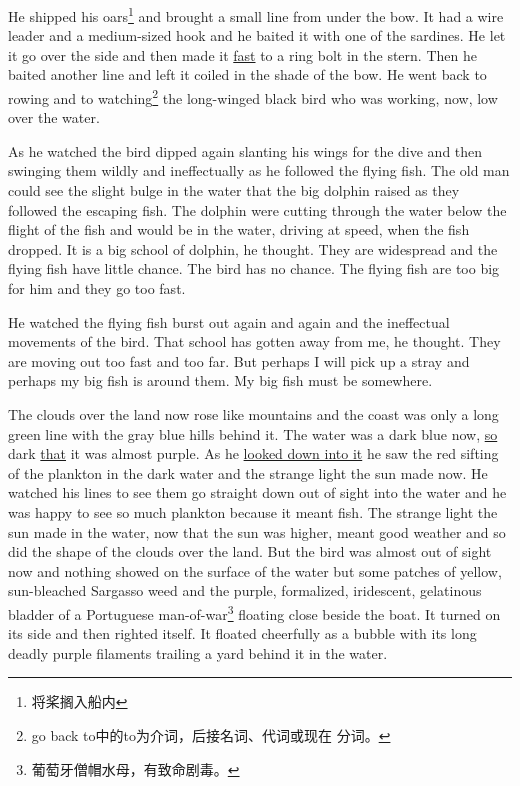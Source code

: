 \documentclass[fontset=ubuntu]{ctexrep}
\newlength{\drop}%
\begin{document}
He shipped his oars\footnote{将桨搁入船内} and brought a small line from
under the bow. It had a \gls{wire} \gls{leader} and a medium-sized hook and
he baited it with one of the sardines. He let it go over the side and then
made it \uline{fast} to a ring \gls{bolt} in the stern. Then he baited
another line and left it coiled in the shade of the bow. He went back to
rowing and to watching\footnote{go back to中的to为介词，后接名词、代词或现在
  分词。} the long-winged black bird who was working, now, low over the
water.

As he watched the bird dipped again slanting his wings for the dive and then
swinging them wildly and \gls{ineffectually} as he followed the flying fish.
The old man could see the \gls{slight} \gls{bulge} in the water that the big
dolphin raised as they followed the escaping fish. The dolphin were cutting
through the water below the flight of the fish and would be in the water,
driving at speed, when the fish dropped. It is a big school of dolphin, he
thought. They are \gls{widespread} and the flying fish have little
\gls{chance}. The bird has no chance. The flying fish are too big for him
and they go too fast.

He watched the flying fish \gls{burst} out again and again and the
\gls{ineffectual} movements of the bird. That school has gotten away from
me, he thought. They are moving out too fast and too far. But perhaps I will
pick up a \gls{stray} and perhaps my big fish is around them. My big fish must be
somewhere.

The clouds over the land now rose like mountains and the coast was only a
long green line with the gray blue hills behind it. The water was a dark
blue now, \uline{so} dark \uline{that} it was almost purple. As he \uline{looked down into it}
he saw the red sifting of the \gls{plankton} in the dark water and the
strange light the sun made now. He watched his lines to see them go straight
down out of sight into the water and he was happy to see so much plankton
because it \gls{meant} fish. The strange light the sun made in the water,
now that the sun was higher, meant good weather and so did the shape of the
clouds over the land. But the bird was almost out of sight now and nothing
showed on the surface of the water but some patches of yellow,
sun-\gls{bleached} \gls{Sargasso} \gls{weed} and the purple,
\gls{formalized}, \gls{iridescent}, \gls{gelatinous} \gls{bladder} of a
Portuguese man-of-war\footnote{葡萄牙僧帽水母，有致命剧毒。} floating close
beside the boat. It turned on its side and then righted itself. It floated
cheerfully as a \gls{bubble} with its long deadly purple \glspl{filament}
\gls{trailing} a \gls{yard} behind it in the water.
\end{document}
